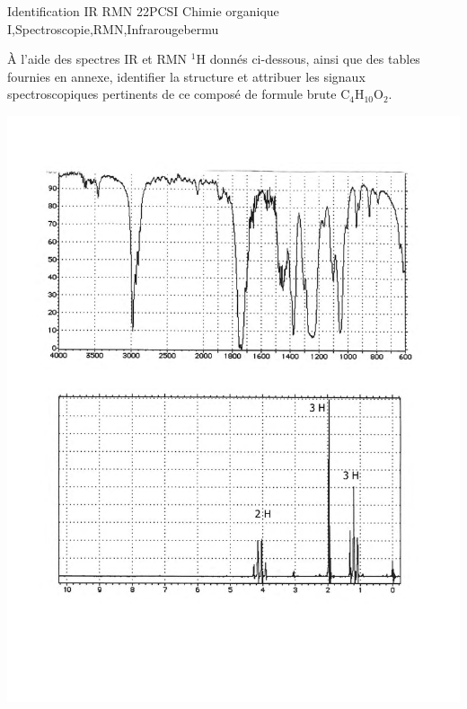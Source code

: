 \begin{exercise}{Identification IR RMN 2}{2}{PCSI}
{Chimie organique I,Spectroscopie,RMN,Infrarouge}{bermu}

À l'aide des spectres IR et RMN $^{1}$H donnés ci-dessous, ainsi que des tables fournies en annexe, identifier la structure et attribuer les signaux spectroscopiques pertinents de ce composé de formule brute $\mathrm{C_4H_{10}O_2}$.
 
\vspace{2em}
 
\includegraphics[width=\linewidth]{chimiePC/orga/IR_RMN_2.pdf}

\end{exercise}

\begin{solution}
\begin{center}
\end{center}
\end{solution}

